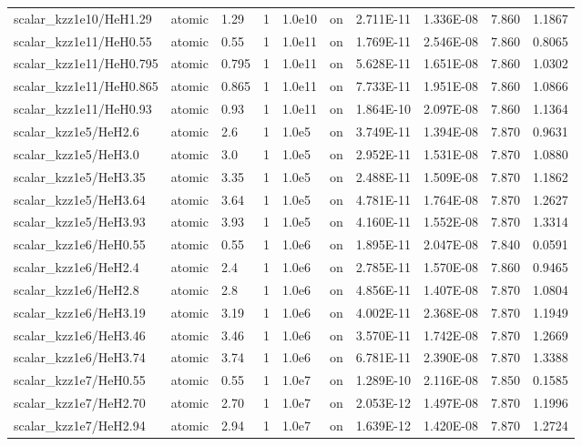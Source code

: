 \documentclass[11pt]{my_memo}
\begin{document}
\begin{longtable}{@{}l >{\raggedright\arraybackslash}p{1.5cm} l l l l l l r r@{}}
scalar\_kzz1e10/HeH1.29 & atomic & 1.29 & 1 & 1.0e10 & on & 2.711E-11 & 1.336E-08 & 7.860 & 1.1867\\
scalar\_kzz1e11/HeH0.55 & atomic & 0.55 & 1 & 1.0e11 & on & 1.769E-11 & 2.546E-08 & 7.860 & 0.8065\\
scalar\_kzz1e11/HeH0.795 & atomic & 0.795 & 1 & 1.0e11 & on & 5.628E-11 & 1.651E-08 & 7.860 & 1.0302\\
scalar\_kzz1e11/HeH0.865 & atomic & 0.865 & 1 & 1.0e11 & on & 7.733E-11 & 1.951E-08 & 7.860 & 1.0866\\
scalar\_kzz1e11/HeH0.93 & atomic & 0.93 & 1 & 1.0e11 & on & 1.864E-10 & 2.097E-08 & 7.860 & 1.1364\\
scalar\_kzz1e5/HeH2.6 & atomic & 2.6 & 1 & 1.0e5 & on & 3.749E-11 & 1.394E-08 & 7.870 & 0.9631\\
scalar\_kzz1e5/HeH3.0 & atomic & 3.0 & 1 & 1.0e5 & on & 2.952E-11 & 1.531E-08 & 7.870 & 1.0880\\
scalar\_kzz1e5/HeH3.35 & atomic & 3.35 & 1 & 1.0e5 & on & 2.488E-11 & 1.509E-08 & 7.870 & 1.1862\\
scalar\_kzz1e5/HeH3.64 & atomic & 3.64 & 1 & 1.0e5 & on & 4.781E-11 & 1.764E-08 & 7.870 & 1.2627\\
scalar\_kzz1e5/HeH3.93 & atomic & 3.93 & 1 & 1.0e5 & on & 4.160E-11 & 1.552E-08 & 7.870 & 1.3314\\
scalar\_kzz1e6/HeH0.55 & atomic & 0.55 & 1 & 1.0e6 & on & 1.895E-11 & 2.047E-08 & 7.840 & 0.0591\\
scalar\_kzz1e6/HeH2.4 & atomic & 2.4 & 1 & 1.0e6 & on & 2.785E-11 & 1.570E-08 & 7.860 & 0.9465\\
scalar\_kzz1e6/HeH2.8 & atomic & 2.8 & 1 & 1.0e6 & on & 4.856E-11 & 1.407E-08 & 7.870 & 1.0804\\
scalar\_kzz1e6/HeH3.19 & atomic & 3.19 & 1 & 1.0e6 & on & 4.002E-11 & 2.368E-08 & 7.870 & 1.1949\\
scalar\_kzz1e6/HeH3.46 & atomic & 3.46 & 1 & 1.0e6 & on & 3.570E-11 & 1.742E-08 & 7.870 & 1.2669\\
scalar\_kzz1e6/HeH3.74 & atomic & 3.74 & 1 & 1.0e6 & on & 6.781E-11 & 2.390E-08 & 7.870 & 1.3388\\
scalar\_kzz1e7/HeH0.55 & atomic & 0.55 & 1 & 1.0e7 & on & 1.289E-10 & 2.116E-08 & 7.850 & 0.1585\\
scalar\_kzz1e7/HeH2.70 & atomic & 2.70 & 1 & 1.0e7 & on & 2.053E-12 & 1.497E-08 & 7.870 & 1.1996\\
scalar\_kzz1e7/HeH2.94 & atomic & 2.94 & 1 & 1.0e7 & on & 1.639E-12 & 1.420E-08 & 7.870 & 1.2724\\

\end{longtable}
\end{document}
